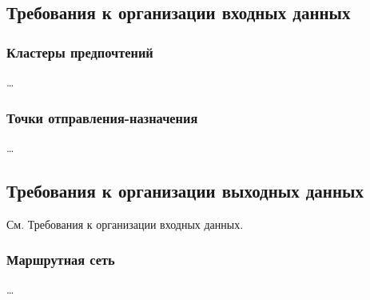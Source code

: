 

\subsection{Требования к организации входных данных}


\subsubsection{Кластеры предпочтений}
\ldots
\subsubsection{Точки отправления-назначения}
\ldots

\subsection{Требования к организации выходных данных}
См. Требования к организации входных данных.

\subsubsection{Маршрутная сеть}
\ldots

